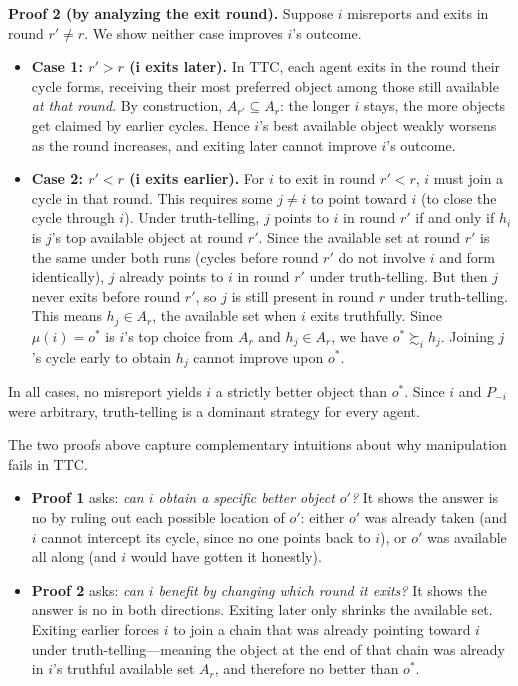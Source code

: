 {  \medskip
  \noindent\textbf{Proof 2 (by analyzing the exit round).}
  Suppose $i$ misreports and exits in round $r' \neq r$. We show
  neither case improves $i$'s outcome.

  \begin{itemize}
    \item \textbf{Case 1: $r' > r$ (i exits later).} In TTC, each
    agent exits in the round their cycle forms, receiving their most
    preferred object among those still available \emph{at that round}.
    By construction, $A_{r'} \subseteq A_r$: the longer $i$ stays, the
    more objects get claimed by earlier cycles. Hence $i$'s best
    available object weakly worsens as the round increases, and exiting
    later cannot improve $i$'s outcome.

    \item \textbf{Case 2: $r' < r$ (i exits earlier).} For $i$ to exit
    in round $r' < r$, $i$ must join a cycle in that round. This
    requires some $j \neq i$ to point toward $i$ (to close the cycle
    through $i$). Under truth-telling, $j$ points to $i$ in round $r'$
    if and only if $h_i$ is $j$'s top available object at round $r'$.
    Since the available set at round $r'$ is the same under both runs
    (cycles before round $r'$ do not involve $i$ and form identically),
    $j$ already points to $i$ in round $r'$ under truth-telling. But
    then $j$ never exits before round $r'$, so $j$ is still present in
    round $r$ under truth-telling. This means $h_j \in A_r$, the
    available set when $i$ exits truthfully. Since $\mu(i) = o^*$ is
    $i$'s top choice from $A_r$ and $h_j \in A_r$, we have $o^*
    \succsim_i h_j$. Joining $j$'s cycle early to obtain $h_j$ cannot
    improve upon $o^*$.
  \end{itemize}

  In all cases, no misreport yields $i$ a strictly better object than
  $o^*$. Since $i$ and $P_{-i}$ were arbitrary, truth-telling is a
  dominant strategy for every agent.
}

The two proofs above capture complementary intuitions about why
  manipulation fails in TTC.
\begin{itemize}
  \item \textbf{Proof 1} asks: \textit{can $i$ obtain a specific better
  object $o'$?} It shows the answer is no by ruling out each possible
  location of $o'$: either $o'$ was already taken (and $i$ cannot
  intercept its cycle, since no one points back to $i$), or $o'$ was
  available all along (and $i$ would have gotten it honestly).
  \item \textbf{Proof 2} asks: \textit{can $i$ benefit by changing which
  round it exits?} It shows the answer is no in both directions.
  Exiting later only shrinks the available set. Exiting earlier forces
  $i$ to join a chain that was already pointing toward $i$ under
  truth-telling---meaning the object at the end of that chain was
  already in $i$'s truthful available set $A_r$, and therefore no
  better than $o^*$.
\end{itemize}

